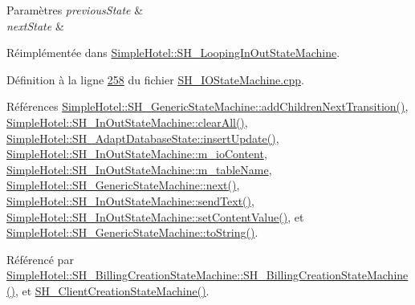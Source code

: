 \begin{DoxyParams}{Paramètres}
{\em previous\-State} & \\
\hline
{\em next\-State} & \\
\hline
\end{DoxyParams}


Réimplémentée dans \hyperlink{classSimpleHotel_1_1SH__LoopingInOutStateMachine_a2ac2ff43d97fd1b12e1b30d6818f33e4}{Simple\-Hotel\-::\-S\-H\-\_\-\-Looping\-In\-Out\-State\-Machine}.



Définition à la ligne \hyperlink{SH__IOStateMachine_8cpp_source_l00258}{258} du fichier \hyperlink{SH__IOStateMachine_8cpp_source}{S\-H\-\_\-\-I\-O\-State\-Machine.\-cpp}.



Références \hyperlink{classSimpleHotel_1_1SH__GenericStateMachine_a3771c91002bec6ab9414703251cc7825}{Simple\-Hotel\-::\-S\-H\-\_\-\-Generic\-State\-Machine\-::add\-Children\-Next\-Transition()}, \hyperlink{classSimpleHotel_1_1SH__InOutStateMachine_a2b6d60f624ba23c8fc3e52f73e867c86}{Simple\-Hotel\-::\-S\-H\-\_\-\-In\-Out\-State\-Machine\-::clear\-All()}, \hyperlink{classSimpleHotel_1_1SH__AdaptDatabaseState_af125e11b83df08b8e67f90c55c69d583}{Simple\-Hotel\-::\-S\-H\-\_\-\-Adapt\-Database\-State\-::insert\-Update()}, \hyperlink{classSimpleHotel_1_1SH__InOutStateMachine_a4b0a3a48b0da31fddb724a357ad9b52c}{Simple\-Hotel\-::\-S\-H\-\_\-\-In\-Out\-State\-Machine\-::m\-\_\-io\-Content}, \hyperlink{classSimpleHotel_1_1SH__InOutStateMachine_a15c063debdaa4c87bd4925867a13ce9e}{Simple\-Hotel\-::\-S\-H\-\_\-\-In\-Out\-State\-Machine\-::m\-\_\-table\-Name}, \hyperlink{classSimpleHotel_1_1SH__GenericStateMachine_a2de14d4920ae8c10b70c2d73fc2d4a93}{Simple\-Hotel\-::\-S\-H\-\_\-\-Generic\-State\-Machine\-::next()}, \hyperlink{classSimpleHotel_1_1SH__InOutStateMachine_ae81d4a51fcd3277ebfc11af978b74c0b}{Simple\-Hotel\-::\-S\-H\-\_\-\-In\-Out\-State\-Machine\-::send\-Text()}, \hyperlink{classSimpleHotel_1_1SH__InOutStateMachine_aaf92da452f6cf7cc57aa9e60f88322e4}{Simple\-Hotel\-::\-S\-H\-\_\-\-In\-Out\-State\-Machine\-::set\-Content\-Value()}, et \hyperlink{classSimpleHotel_1_1SH__GenericStateMachine_ad6dd1d0986c40684410ed94f1f610b12}{Simple\-Hotel\-::\-S\-H\-\_\-\-Generic\-State\-Machine\-::to\-String()}.



Référencé par \hyperlink{classSimpleHotel_1_1SH__BillingCreationStateMachine_a8c7d39e11d0ced1fd9c27a5550465b86}{Simple\-Hotel\-::\-S\-H\-\_\-\-Billing\-Creation\-State\-Machine\-::\-S\-H\-\_\-\-Billing\-Creation\-State\-Machine()}, et \hyperlink{classSimpleHotel_1_1SH__ClientCreationStateMachine_a301eb77d9ad72102d5fa8952980cf8a3}{S\-H\-\_\-\-Client\-Creation\-State\-Machine()}.



